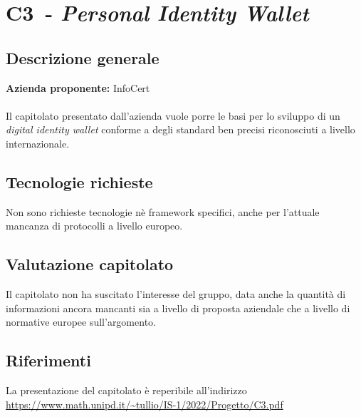 
\renewcommand{\capName}{\textit{Personal Identity Wallet}} %
\renewcommand{\capCode}{C3} %
\renewcommand{\capLink}{https://www.math.unipd.it/~tullio/IS-1/2022/Progetto/C3.pdf} %
\renewcommand{\capProposer}{InfoCert} %


\section{\capCode\ - \capName} 
\subsection{Descrizione generale}
\textbf{Azienda proponente:} InfoCert\\
\\
Il capitolato presentato dall'azienda vuole porre le basi per lo sviluppo di un \textit{digital identity wallet} conforme a degli standard ben precisi riconosciuti a livello internazionale.

\subsection{Tecnologie richieste}
Non sono richieste tecnologie nè framework specifici, anche per l'attuale mancanza di protocolli a livello europeo.

\subsection{Valutazione capitolato}
Il capitolato non ha suscitato l'interesse del gruppo, data anche la quantità di informazioni ancora mancanti sia a livello di proposta aziendale che a livello di normative europee sull'argomento.

\subsection{Riferimenti}
La presentazione del capitolato è reperibile all'indirizzo \url{\capLink}